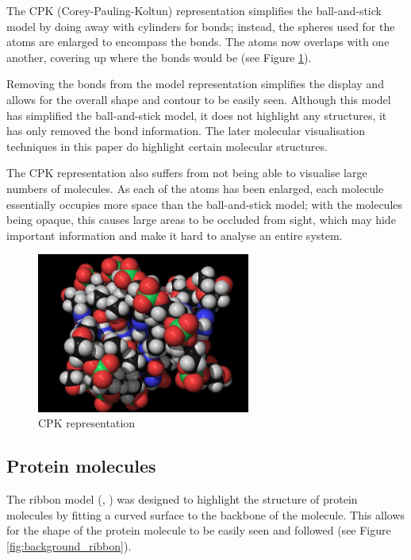 The CPK (Corey-Pauling-Koltun) \citep{corey53} representation simplifies the
ball-and-stick model by doing away with cylinders for bonds; instead, the
spheres used for the atoms are enlarged to encompass the bonds. The atoms now
overlaps with one another, covering up where the bonds would be (see Figure
\ref{fig:background_cpk}).

Removing the bonds from the model representation simplifies the display and
allows for the overall shape and contour to be easily seen. Although this model
has simplified the ball-and-stick model, it does not highlight any structures,
it has only removed the bond information. The later molecular visualisation
techniques in this paper do highlight certain molecular structures.

The CPK representation also suffers from not being able to visualise large
numbers of molecules. As each of the atoms has been enlarged, each molecule
essentially occupies more space than the ball-and-stick model; with the
molecules being opaque, this causes large areas to be occluded from sight, which
may hide important information and make it hard to analyse an entire system.

\begin{figure}[h!]
  \begin{center}
    \includegraphics[width=70mm]{CPK-big}
  \end{center}
  \caption{CPK representation}
  \label{fig:background_cpk}
\end{figure}


\subsection{Protein molecules}
\label{sub:background_protein}

The ribbon model (\citep{richardson81}, \citep{carson87}) was designed to
highlight the structure of protein molecules by fitting a curved surface to the
backbone of the molecule. This allows for the shape of the protein molecule to
be easily seen and followed (see Figure \ref{fig:background_ribbon}).

